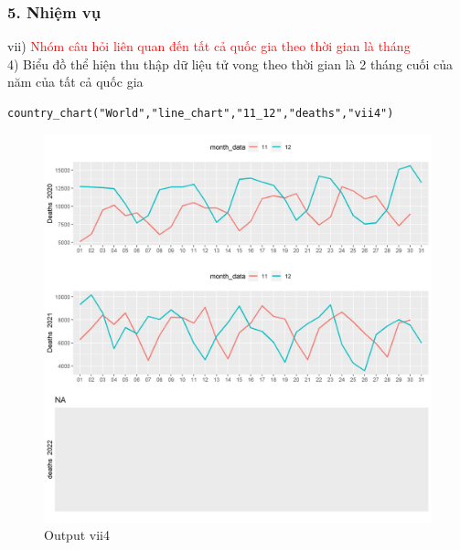 \documentclass[english,10pt,table]{beamer}
\begin{document}
\begin{frame}[fragile]
\frametitle{5.  Nhiệm vụ}
vii) \textcolor{red}{Nhóm câu hỏi liên quan đến tất cả quốc gia theo thời gian là tháng }\\
    4) Biểu đồ thể hiện thu thập dữ liệu tử vong theo thời gian là 2 tháng cuối của năm của tất cả quốc gia
\begin{lstlisting}[frame = single,basicstyle=\tiny]
country_chart("World","line_chart","11_12","deaths","vii4")
		\end{lstlisting}
			\begin{figure}[h!]
	\begin{center}
		    \includegraphics[scale = 0.23]{Images/VII/vii4 World .jpeg}
		     \caption{Output vii4}
		\end{center}
		\end{figure}
\end{frame}
\end{document}
